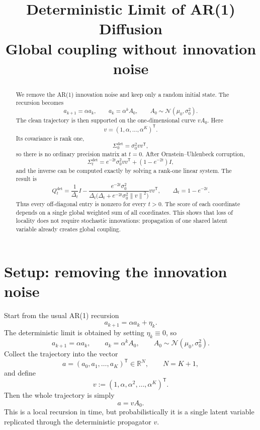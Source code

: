 \documentclass[11pt]{article}
\title{Deterministic Limit of AR(1) Diffusion\\[2mm]
\large Global coupling without innovation noise}
\author{}
\date{}
\newcommand{\R}{\mathbb{R}}
\newcommand{\Id}{I}
\newcommand{\trans}{\mathsf{T}}
\newcommand{\Ncal}{\mathcal{N}}
\newcommand{\norm}[1]{\left\lVert #1 \right\rVert}
\begin{document}
\maketitle

\begin{abstract}
We remove the AR(1) innovation noise and keep only a random initial state. The recursion becomes
\[
 a_{k+1}=\alpha a_k,
 \qquad
 a_k=\alpha^k A_0,
 \qquad
 A_0\sim\Ncal(\mu_0,\sigma_0^2).
\]
The clean trajectory is then supported on the one-dimensional curve $vA_0$. Here
\[
 v=(1,\alpha,\dots,\alpha^K)^\trans.
\]
Its covariance is rank one,
\[
\Sigma_0^{\mathrm{det}}=\sigma_0^2 vv^\trans,
\]
so there is no ordinary precision matrix at $t=0$. After Ornstein--Uhlenbeck corruption,
\[
\Sigma_t^{\mathrm{det}}=e^{-2t}\sigma_0^2 vv^\trans+(1-e^{-2t})\Id,
\]
and the inverse can be computed exactly by solving a rank-one linear system. The result is
\[
Q_t^{\mathrm{det}}=
\frac{1}{\Delta_t}\Id-
\frac{e^{-2t}\sigma_0^2}{\Delta_t\bigl(\Delta_t+e^{-2t}\sigma_0^2\norm{v}^2\bigr)}vv^\trans,
\qquad
\Delta_t=1-e^{-2t}.
\]
Thus every off-diagonal entry is nonzero for every $t>0$. The score of each coordinate depends on a single global weighted sum of all coordinates. This shows that loss of locality does not require stochastic innovations: propagation of one shared latent variable already creates global coupling.
\end{abstract}

\section{Setup: removing the innovation noise}
Start from the usual AR(1) recursion
\[
 a_{k+1}=\alpha a_k+\eta_k.
\]
The deterministic limit is obtained by setting $\eta_k\equiv 0$, so
\begin{equation}\label{eq:det_rec}
 a_{k+1}=\alpha a_k,
 \qquad
 a_k=\alpha^k A_0,
 \qquad
 A_0\sim\Ncal(\mu_0,\sigma_0^2).
\end{equation}
Collect the trajectory into the vector
\[
 a=(a_0,a_1,\dots,a_K)^\trans\in\R^N,
 \qquad N=K+1,
\]
and define
\begin{equation}\label{eq:v_def}
 v:=(1,\alpha,\alpha^2,\dots,\alpha^K)^\trans.
\end{equation}
Then the whole trajectory is simply
\begin{equation}\label{eq:a_vA0}
 a= v A_0.
\end{equation}
This is a local recursion in time, but probabilistically it is a single latent variable replicated through the deterministic propagator $v$.
\end{document}
